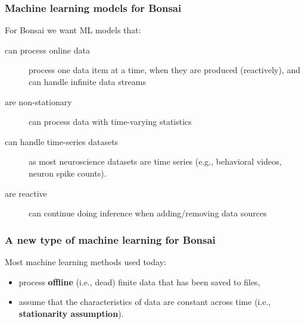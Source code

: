 \begin{frame}
    \frametitle{Machine learning models for Bonsai}

    For Bonsai we want ML models that:

    \begin{description}

        \item[can process online data] process one data item at a time, when they are produced (reactively), and can handle infinite data streams

        \item[are non-stationary] can process data with time-varying statistics

        \item[can handle time-series datasets] as most neuroscience datasets are time series (e.g., behavioral videos, neuron spike counts).

        \item[are reactive] can continue doing inference when adding/removing data sources

    \end{description}

\end{frame}

\begin{frame}
    \frametitle{A new type of machine learning for Bonsai}

    Most machine learning methods used today:

    \begin{itemize}

        \item process \textbf{offline} (i.e., dead) finite data that has been saved to files,

        \item assume that the characteristics of data are constant across time
            (i.e., \textbf{stationarity assumption}).

    \end{itemize}


\end{frame}
